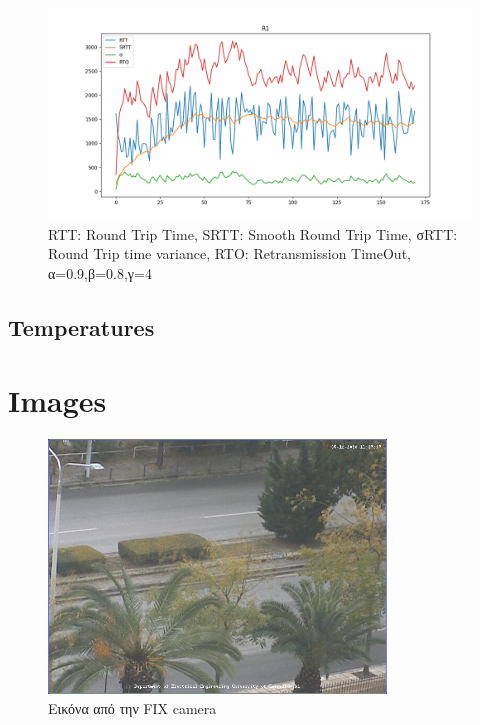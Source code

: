 \documentclass{article}
\begin{document}
\begin{figure}[H]
  \begin{center}
    \includegraphics[width=\textwidth]{R1.png}
  \end{center}
  \caption{RTT: Round Trip Time, SRTT: Smooth Round Trip Time, σ{\tiny{RTT}}:
  Round Trip time variance, RTO: Retransmission TimeOut, α=0.9,β=0.8,γ=4}
\end{figure}

\subsection{Temperatures}


\section{Images}

\begin{figure}[H]
  \begin{center}
    \includegraphics[width=0.8\textwidth]{../../results/session2/E1.jpg}
  \end{center}
  \caption{Εικόνα από την FIX camera}
\end{figure}
\end{document}
